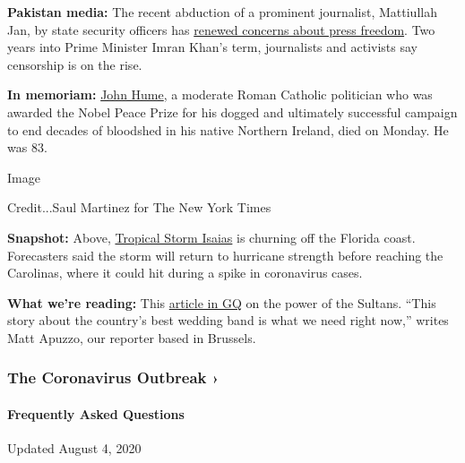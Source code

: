 \textbf{Pakistan media:} The recent abduction of a prominent journalist,
Mattiullah Jan, by state security officers has
\href{https://www.nytimes3xbfgragh.onion/2020/08/03/world/asia/pakistan-media-abductions.html}{renewed
concerns about press freedom}. Two years into Prime Minister Imran
Khan's term, journalists and activists say censorship is on the rise.

\textbf{In memoriam:}
\href{https://www.nytimes3xbfgragh.onion/2020/08/03/obituaries/john-hume-dies.html}{John
Hume}, a moderate Roman Catholic politician who was awarded the Nobel
Peace Prize for his dogged and ultimately successful campaign to end
decades of bloodshed in his native Northern Ireland, died on Monday. He
was 83.

Image

Credit...Saul Martinez for The New York Times

\textbf{Snapshot:} Above,
\href{https://www.nytimes3xbfgragh.onion/2020/08/03/us/isaias-storm-updates.html\#link-17297d4d}{Tropical
Storm Isaias} is churning off the Florida coast. Forecasters said the
storm will return to hurricane strength before reaching the Carolinas,
where it could hit during a spike in coronavirus cases.

\textbf{What we're reading:} This
\href{https://www.gq.com/story/americas-best-wedding-band-the-sultans}{article
in GQ} on the power of the Sultans. ``This story about the country's
best wedding band is what we need right now,'' writes Matt Apuzzo, our
reporter based in Brussels.

\href{https://www.nytimes3xbfgragh.onion/news-event/coronavirus?action=click\&pgtype=Article\&state=default\&region=MAIN_CONTENT_3\&context=storylines_faq}{}

\hypertarget{the-coronavirus-outbreak-}{%
\subsubsection{The Coronavirus Outbreak
›}\label{the-coronavirus-outbreak-}}

\hypertarget{frequently-asked-questions}{%
\paragraph{Frequently Asked
Questions}\label{frequently-asked-questions}}

Updated August 4, 2020

